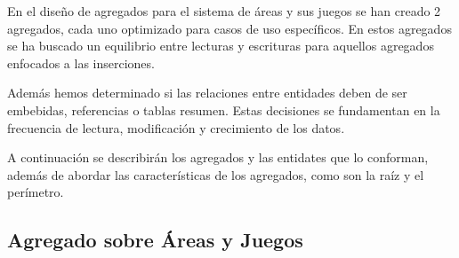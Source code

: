 \documentclass[]{article}
\begin{document}
En el diseño de agregados para el sistema de áreas y sus juegos se han creado 2 agregados, cada uno optimizado para casos de uso específicos. En estos agregados se ha buscado un equilibrio entre lecturas y escrituras para aquellos agregados enfocados a las inserciones.

Además hemos determinado si las relaciones entre entidades deben de ser embebidas, referencias o tablas resumen. Estas decisiones se fundamentan en la frecuencia de lectura, modificación y crecimiento de los datos.

A continuación se describirán los agregados y las entidates que lo conforman, además de abordar las características de los agregados, como son la raíz y el perímetro.

\subsection{Agregado sobre Áreas y Juegos}
\label{sub_sec:agregado_area_juego}
\end{document}
